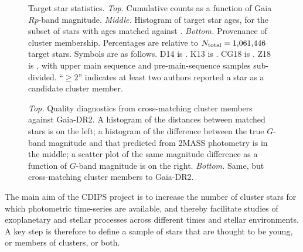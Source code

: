 \documentclass[12pt,twocolumn,tighten]{aastex62}
\begin{document}
\begin{figure}[!t]
	\begin{center}
		\leavevmode
		\vspace{-0.8cm}
		\vspace{-0.8cm}
	\end{center}
	\vspace{-0.8cm}
	\caption{
		Target star statistics.
		{\it Top.} Cumulative counts as a function of Gaia $Rp$-band
		magnitude.  
		{\it Middle.} Histogram of target star ages, for the subset of
		stars with ages matched against \citet{Kharchenko_et_al_2013}.
		{\it Bottom.} Provenance of cluster membership.  Percentages are
		relative to $N_{\rm total}=1{,}061{,}446$ target stars. Symbols
		are as follows.
		D14 is \citet{dias_proper_2014}.
		K13 is \citet{Kharchenko_et_al_2013}.
		CG18 is \citet{cantat-gaudin_gaia_2018}.
		Z18 is \citet{zari_3d_2018}, with upper main sequence and
		pre-main-sequence samples sub-divided.
		``$\geq 2$'' indicates at least two authors reported a star as a
		candidate cluster member.
		\label{fig:cdips_targets}
	}
\end{figure}

\begin{figure}[!t]
	\vspace{-1.1cm}
	\vspace{-0.8cm}
	\caption{
		{\it Top.} Quality diagnostics from cross-matching
		\cite{Kharchenko_et_al_2013} cluster members against Gaia-DR2.
		A histogram of the distances between matched stars is on the left; a
		histogram of the difference between the true $G$-band magnitude
		and that predicted from 2MASS photometry is in the middle; a scatter
		plot of the same magnitude difference as a function of $G$-band
		magnitude is on the right.
		{\it Bottom.} Same, but cross-matching \cite{dias_proper_2014}
		cluster members to Gaia-DR2.
	}
	\label{fig:xmatch_info}
\end{figure}

The main aim of the CDIPS project is to increase the number of cluster
stars for which photometric time-series are available, and thereby
facilitate studies of exoplanetary and stellar processes across
different times and stellar environments.  A key step is
therefore to define a sample of stars that are thought to be young, or
members of clusters, or both.
\end{document}
